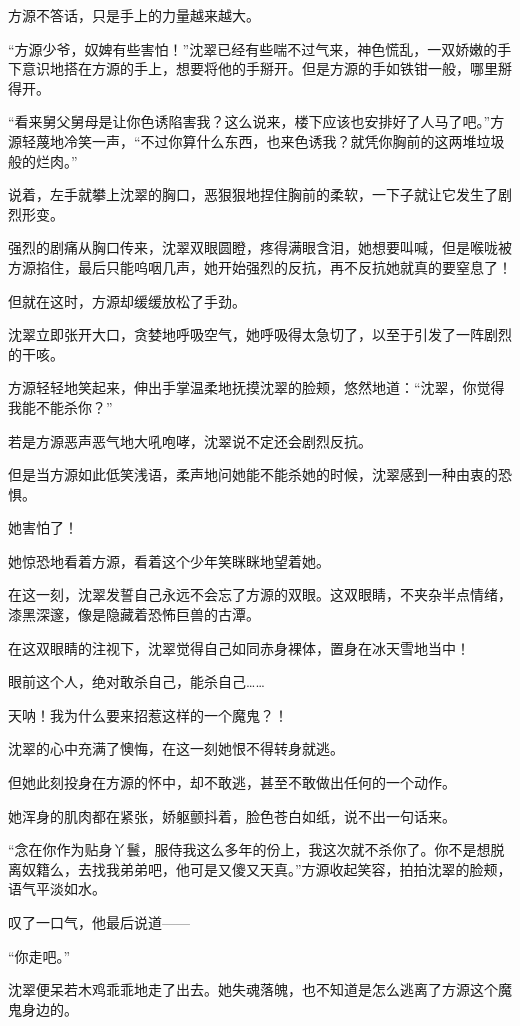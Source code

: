 \begin{this_body}
方源不答话，只是手上的力量越来越大。

“方源少爷，奴婢有些害怕！”沈翠已经有些喘不过气来，神色慌乱，一双娇嫩的手下意识地搭在方源的手上，想要将他的手掰开。但是方源的手如铁钳一般，哪里掰得开。

“看来舅父舅母是让你色诱陷害我？这么说来，楼下应该也安排好了人马了吧。”方源轻蔑地冷笑一声，“不过你算什么东西，也来色诱我？就凭你胸前的这两堆垃圾般的烂肉。”

说着，左手就攀上沈翠的胸口，恶狠狠地捏住胸前的柔软，一下子就让它发生了剧烈形变。

强烈的剧痛从胸口传来，沈翠双眼圆瞪，疼得满眼含泪，她想要叫喊，但是喉咙被方源掐住，最后只能呜咽几声，她开始强烈的反抗，再不反抗她就真的要窒息了！

但就在这时，方源却缓缓放松了手劲。

沈翠立即张开大口，贪婪地呼吸空气，她呼吸得太急切了，以至于引发了一阵剧烈的干咳。

方源轻轻地笑起来，伸出手掌温柔地抚摸沈翠的脸颊，悠然地道：“沈翠，你觉得我能不能杀你？”

若是方源恶声恶气地大吼咆哮，沈翠说不定还会剧烈反抗。

但是当方源如此低笑浅语，柔声地问她能不能杀她的时候，沈翠感到一种由衷的恐惧。

她害怕了！

她惊恐地看着方源，看着这个少年笑眯眯地望着她。

在这一刻，沈翠发誓自己永远不会忘了方源的双眼。这双眼睛，不夹杂半点情绪，漆黑深邃，像是隐藏着恐怖巨兽的古潭。

在这双眼睛的注视下，沈翠觉得自己如同赤身裸体，置身在冰天雪地当中！

眼前这个人，绝对敢杀自己，能杀自己……

天呐！我为什么要来招惹这样的一个魔鬼？！

沈翠的心中充满了懊悔，在这一刻她恨不得转身就逃。

但她此刻投身在方源的怀中，却不敢逃，甚至不敢做出任何的一个动作。

她浑身的肌肉都在紧张，娇躯颤抖着，脸色苍白如纸，说不出一句话来。

“念在你作为贴身丫鬟，服侍我这么多年的份上，我这次就不杀你了。你不是想脱离奴籍么，去找我弟弟吧，他可是又傻又天真。”方源收起笑容，拍拍沈翠的脸颊，语气平淡如水。

叹了一口气，他最后说道——

“你走吧。”

沈翠便呆若木鸡乖乖地走了出去。她失魂落魄，也不知道是怎么逃离了方源这个魔鬼身边的。


\end{this_body}
